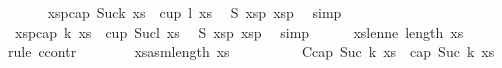 \begin{isabellebody}
\begin{isamarkuptext}
\end{isamarkuptext}\isamarkuptrue%
\ \ \ \ \isamarkupfalse%
\ xs{}p{}{\isacharcolon}{\kern0pt}{\isachardoublequoteopen}{\isasymnot}{\isacharparenleft}{\kern0pt}cap\ {\isacharparenleft}{\kern0pt}Suc{\isacharparenleft}{\kern0pt}k{\isacharplus}{\kern0pt}{}{\isacharparenright}{\kern0pt}{\isacharparenright}{\kern0pt}\ xs{}\ {\isasymor}\ cup\ {\isacharparenleft}{\kern0pt}l{\isacharplus}{\kern0pt}{}{\isacharparenright}{\kern0pt}\ xs{}{\isacharparenright}{\kern0pt}{\isachardoublequoteclose}\ \isamarkupfalse%
\ S{}{\isacharparenleft}{\kern0pt}{}{\isacharparenright}{\kern0pt}\ xs{}p{}\ xs{}p{}\ \isamarkupfalse%
\ simp\isanewline
\ \ \ \ \isamarkupfalse%
\ xs{}p{}{\isacharcolon}{\kern0pt}{\isachardoublequoteopen}{\isasymnot}{\isacharparenleft}{\kern0pt}cap\ {\isacharparenleft}{\kern0pt}k{\isacharplus}{\kern0pt}{}{\isacharparenright}{\kern0pt}\ xs{}\ {\isasymor}\ cup\ {\isacharparenleft}{\kern0pt}Suc{\isacharparenleft}{\kern0pt}l{\isacharplus}{\kern0pt}{}{\isacharparenright}{\kern0pt}{\isacharparenright}{\kern0pt}\ xs{}{\isacharparenright}{\kern0pt}{\isachardoublequoteclose}\ \isamarkupfalse%
\ S{}{\isacharparenleft}{\kern0pt}{}{\isacharparenright}{\kern0pt}\ xs{}p{}\ xs{}p{}\ \isamarkupfalse%
\ simp\isanewline
\isanewline
\ \ \ \ \isamarkupfalse%
\ xs{}{\isacharunderscore}{\kern0pt}len{\isacharunderscore}{\kern0pt}ne{\isacharunderscore}{\kern0pt}{}{\isacharcolon}{\kern0pt}\ {\isachardoublequoteopen}length\ xs{}\ {\isasymnoteq}\ {}{\isachardoublequoteclose}\isanewline
\ \ \ \ \isamarkupfalse%
{\isacharparenleft}{\kern0pt}rule\ ccontr{\isacharparenright}{\kern0pt}\isanewline
\ \ \ \ \ \ \isamarkupfalse%
\ xs{}asm{\isacharcolon}{\kern0pt}{\isachardoublequoteopen}{\isasymnot}length\ xs{}\ {\isasymnoteq}\ {}{\isachardoublequoteclose}\isanewline
\ \ \ \ \ \ \isamarkupfalse%
\ C{}{\isacharcolon}{\kern0pt}{\isachardoublequoteopen}cap\ {\isacharparenleft}{\kern0pt}Suc\ {\isacharparenleft}{\kern0pt}k{\isacharplus}{\kern0pt}{}{\isacharparenright}{\kern0pt}{\isacharparenright}{\kern0pt}\ xs\ {\isasymLongrightarrow}\ cap\ {\isacharparenleft}{\kern0pt}Suc\ {\isacharparenleft}{\kern0pt}k{\isacharplus}{\kern0pt}{}{\isacharparenright}{\kern0pt}{\isacharparenright}{\kern0pt}\ xs{}{\isachardoublequoteclose}\ \isanewline

\end{isabellebody}
